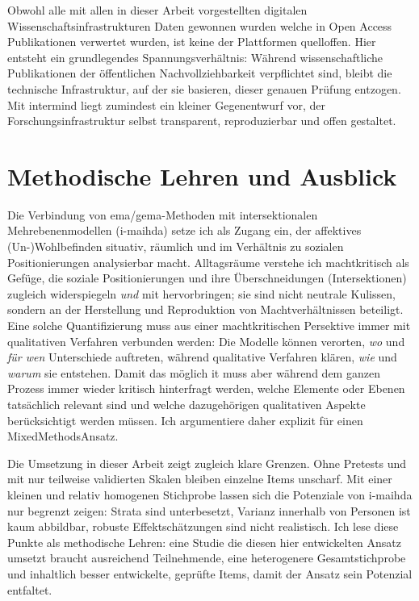 Obwohl alle mit allen in dieser Arbeit vorgestellten digitalen Wissenschaftsinfrastrukturen Daten gewonnen wurden welche in Open Access Publikationen verwertet wurden, ist keine der Plattformen quelloffen. Hier entsteht ein grundlegendes Spannungsverhältnis: Während wissenschaftliche Publikationen der öffentlichen Nachvollziehbarkeit verpflichtet sind, bleibt die technische Infrastruktur, auf der sie basieren, dieser genauen Prüfung entzogen. Mit \gls{intermind} liegt zumindest ein kleiner Gegenentwurf vor, der Forschungsinfrastruktur selbst transparent, reproduzierbar und offen gestaltet.

\section{Methodische Lehren und Ausblick}

Die Verbindung von \gls{ema}/\gls{gema}-Methoden mit intersektionalen Mehrebenenmodellen (\gls{i-maihda}) setze ich als Zugang ein, der affektives (Un-)Wohlbefinden situativ, räumlich und im Verhältnis zu sozialen Positionierungen analysierbar macht. Alltagsräume verstehe ich machtkritisch als Gefüge, die soziale Positionierungen und ihre Überschneidungen (Intersektionen) zugleich widerspiegeln \emph{und} mit hervorbringen; sie sind nicht neutrale Kulissen, sondern an der Herstellung und Reproduktion von Machtverhältnissen beteiligt. 
Eine solche Quantifizierung muss aus einer machtkritischen Persektive immer mit qualitativen Verfahren verbunden werden: Die Modelle können verorten, \emph{wo} und \emph{für wen} Unterschiede auftreten, während qualitative Verfahren klären, \emph{wie} und \emph{warum} sie entstehen. Damit das möglich it muss aber während dem ganzen Prozess immer wieder kritisch hinterfragt werden, welche Elemente oder Ebenen tatsächlich relevant sind und welche dazugehörigen qualitativen Aspekte berücksichtigt werden müssen. Ich argumentiere daher explizit für einen Mixed\-Methods\-Ansatz.

Die Umsetzung in dieser Arbeit zeigt zugleich klare Grenzen. Ohne Pretests und mit nur teilweise validierten Skalen bleiben einzelne Items unscharf. Mit einer kleinen und relativ homogenen Stichprobe lassen sich die Potenziale von \gls{i-maihda} nur begrenzt zeigen: Strata sind unterbesetzt, Varianz innerhalb von Personen ist kaum abbildbar, robuste Effektschätzungen sind nicht realistisch. Ich lese diese Punkte als methodische Lehren: eine Studie die diesen hier entwickelten Ansatz umsetzt braucht ausreichend Teilnehmende, eine heterogenere Gesamtstichprobe und inhaltlich besser entwickelte, geprüfte Items, damit der Ansatz sein Potenzial entfaltet.

